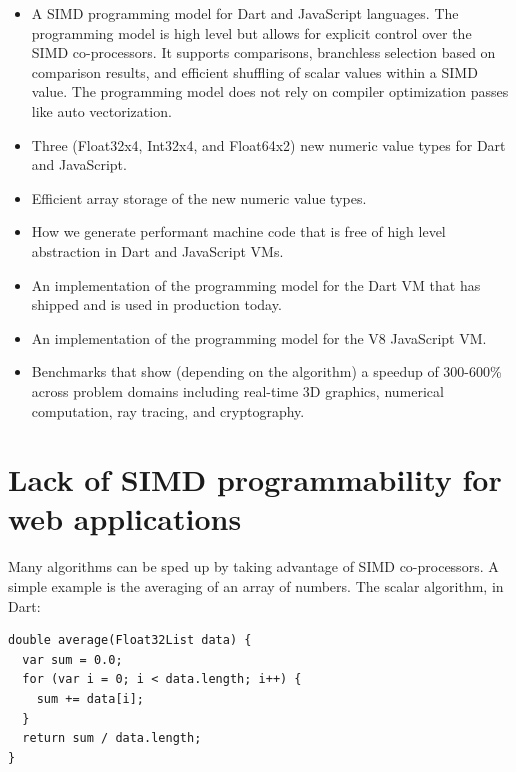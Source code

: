 \documentclass[preprint]{sigplanconf}
\begin{document}
\begin{itemize} 
\item
A SIMD programming model for Dart and JavaScript languages. The programming
model is high level but allows for explicit control over the SIMD co-processors.
It supports comparisons, branchless selection based on comparison results, and
efficient shuffling of scalar values within a SIMD value. The programming model
does not rely on compiler optimization passes like auto vectorization.

\item
Three (Float32x4, Int32x4, and Float64x2) new numeric value types for Dart and
JavaScript.

\item
Efficient array storage of the new numeric value types.

\item
How we generate performant machine code that is free of high level abstraction
in Dart and JavaScript VMs.

\item
An implementation of the programming model for the Dart VM that has shipped and
is used in production today.

\item
An implementation of the programming model for the V8 JavaScript VM.

\item
Benchmarks that show (depending on the algorithm) a speedup of 300-600\% across
problem domains including real-time 3D graphics, numerical computation, ray
tracing, and cryptography.
\end{itemize}

\section{Lack of SIMD programmability for web applications}

Many algorithms can be sped up by taking advantage of SIMD co-processors. A
simple example is the averaging of an array of numbers. The scalar algorithm, in
Dart:

\begin{small}
\begin{lstlisting}
double average(Float32List data) {
  var sum = 0.0;
  for (var i = 0; i < data.length; i++) {
    sum += data[i]; 
  }
  return sum / data.length;
}
\end{lstlisting}
\end{small}
\end{document}
